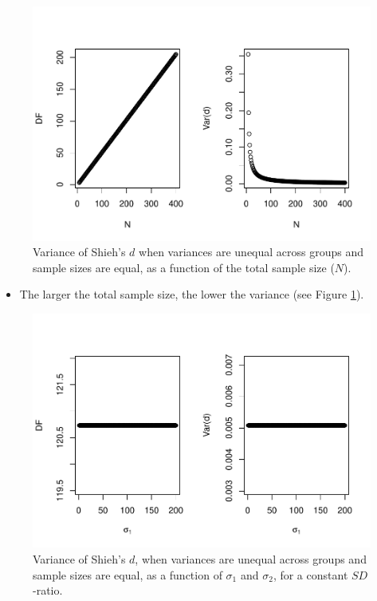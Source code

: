 \documentclass[
  english,
  man,mask]{apa6}
\providecommand{\tightlist}{%
  \setlength{\itemsep}{0pt}\setlength{\parskip}{0pt}}
\begin{document}
\begin{figure}
\centering
\includegraphics{Theoretical-Variance-of-all-estimators-as-a-function-of-population-parameters_files/figure-latex/varshiehhetbalNsize2-1.pdf}
\caption{\label{fig:varshiehhetbalNsize2}Variance of Shieh's \(d\) when variances are unequal across groups and sample sizes are equal, as a function of the total sample size (\(N\)).}
\end{figure}

\begin{itemize}
\tightlist
\item
  The larger the total sample size, the lower the variance (see Figure \ref{fig:varshiehhetbalNsize2}).
\end{itemize}

\begin{figure}
\centering
\includegraphics{Theoretical-Variance-of-all-estimators-as-a-function-of-population-parameters_files/figure-latex/varshiehhetbalvariance2-1.pdf}
\caption{\label{fig:varshiehhetbalvariance2}Variance of Shieh's \(d\), when variances are unequal across groups and sample sizes are equal, as a function of \(\sigma_1\) and \(\sigma_2\), for a constant \(SD\)-ratio.}
\end{figure}
\end{document}
